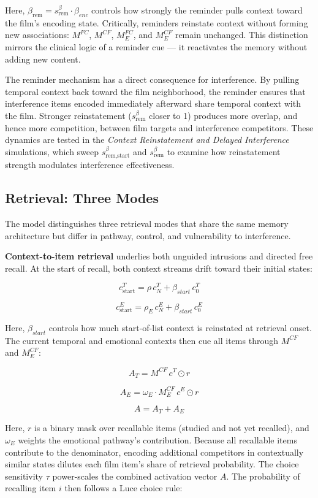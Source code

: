 \documentclass[
  man,
  floatsintext,
  longtable,
  nolmodern,
  notxfonts,
  notimes,
  draftfirst,
  colorlinks=true,linkcolor=blue,citecolor=blue,urlcolor=blue]{apa7}
\begin{document}
Here, \(\beta_\text{rem} = s^{\beta}_\text{rem} \cdot \beta_{enc}\)
controls how strongly the reminder pulls context toward the film's
encoding state. Critically, reminders reinstate context without forming
new associations: \(M^{FC}\), \(M^{CF}\), \(M^{FC}_E\), and \(M^{CF}_E\)
remain unchanged. This distinction mirrors the clinical logic of a
reminder cue --- it reactivates the memory without adding new content.

The reminder mechanism has a direct consequence for interference. By
pulling temporal context back toward the film neighborhood, the reminder
ensures that interference items encoded immediately afterward share
temporal context with the film. Stronger reinstatement
(\(s^{\beta}_\text{rem}\) closer to 1) produces more overlap, and hence
more competition, between film targets and interference competitors.
These dynamics are tested in the \emph{Context Reinstatement and Delayed
Interference} simulations, which sweep \(s^{\beta}_\text{rem,start}\)
and \(s^{\beta}_\text{rem}\) to examine how reinstatement strength
modulates interference effectiveness.

\subsection{Retrieval: Three Modes}\label{retrieval-three-modes}

The model distinguishes three retrieval modes that share the same memory
architecture but differ in pathway, control, and vulnerability to
interference.

\textbf{Context-to-item retrieval} underlies both unguided intrusions
and directed free recall. At the start of recall, both context streams
drift toward their initial states:

\[
c^T_\text{start} = \rho \, c^T_N + \beta_{start} \, c^T_0
\]

\[
c^E_\text{start} = \rho_E \, c^E_N + \beta_{start} \, c^E_0
\]

Here, \(\beta_{start}\) controls how much start-of-list context is
reinstated at retrieval onset. The current temporal and emotional
contexts then cue all items through \(M^{CF}\) and \(M^{CF}_E\):

\[
A_T = M^{CF} \, c^T \odot r
\]

\[
A_E = \omega_E \cdot M^{CF}_E \, c^E \odot r
\]

\[
A = A_T + A_E
\]

Here, \(r\) is a binary mask over recallable items (studied and not yet
recalled), and \(\omega_E\) weights the emotional pathway's
contribution. Because all recallable items contribute to the
denominator, encoding additional competitors in contextually similar
states dilutes each film item's share of retrieval probability. The
choice sensitivity \(\tau\) power-scales the combined activation vector
\(A\). The probability of recalling item \(i\) then follows a Luce
choice rule:
\end{document}
